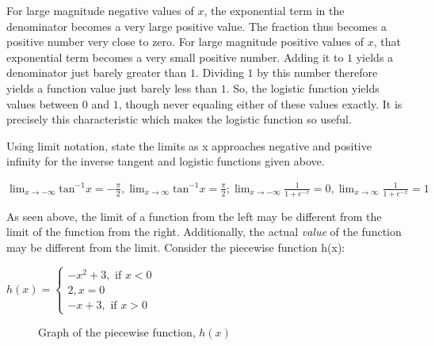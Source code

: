 For large magnitude negative values of $x$, the exponential term in the denominator 
becomes a very large positive value. The fraction thus becomes a positive number 
very close to zero. For large magnitude positive values of $x$, that exponential 
term becomes a very small positive number. Adding it to $1$ yields a denominator 
just barely greater than $1$. Dividing $1$ by this number therefore yields a function 
value just barely less than $1$. So, the logistic function yields values between 
$0$ and $1$, though never equaling either of these values exactly. It is precisely 
this characteristic which makes the logistic function so useful.

\begin{Exercise}[title=Limits Practice 3, label=limits3]
Using limit notation, state the limits as x approaches negative and positive 
infinity for the inverse tangent and logistic functions given above.
  \vspace{40mm}
\end{Exercise}
\begin{Answer}[ref=limits3] 
	$ \lim_{x \rightarrow -\infty} \text{tan}^{-1}x = -\frac{\pi}{2}, \lim_{x 
	\rightarrow \infty} \text{tan}^{-1}x = \frac{\pi}{2}; \lim_{x \rightarrow 
	-\infty} \frac{1}{1 + e^{-x}} = 0, \lim_{x \rightarrow \infty} \frac{1}{1 + 
	e^{-x}} = 1 $
\end{Answer}


As seen above, the limit of a function from the left may be different from the 
limit of the function from the right. Additionally, the actual \textit{value} of 
the function may be different from the limit. Consider the piecewise function h(x):

$h(x) = \begin{cases}
    -x^2+3, \text{ if } x < 0\\
    2, x=0\\
    -x+3, \text{ if } x > 0
\end{cases}$

\begin{figure}[H]
\centering
{}
\caption{Graph of the piecewise function, $h(x)$}
\end{figure}



